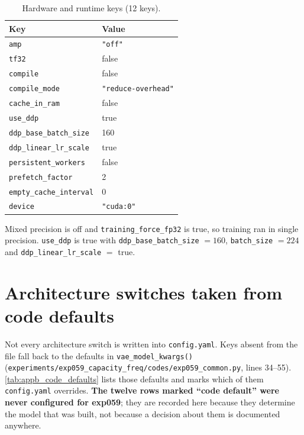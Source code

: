 \begin{table}[htbp]
\centering
\caption{Hardware and runtime keys (12 keys).}
\label{tab:appb_hardware}
\begin{tabular}{@{}ll@{}}
\hline
Key & Value \\
\hline
\texttt{amp} & \texttt{"off"} \\
\texttt{tf32} & false \\
\texttt{compile} & false \\
\texttt{compile\_mode} & \texttt{"reduce-overhead"} \\
\texttt{cache\_in\_ram} & false \\
\texttt{use\_ddp} & true \\
\texttt{ddp\_base\_batch\_size} & 160 \\
\texttt{ddp\_linear\_lr\_scale} & true \\
\texttt{persistent\_workers} & false \\
\texttt{prefetch\_factor} & 2 \\
\texttt{empty\_cache\_interval} & 0 \\
\texttt{device} & \texttt{"cuda:0"} \\
\hline
\end{tabular}
\end{table}

Mixed precision is off and \texttt{training\_force\_fp32} is true, so training ran in
single precision. \texttt{use\_ddp} is true with \texttt{ddp\_base\_batch\_size} $=160$,
\texttt{batch\_size} $=224$ and \texttt{ddp\_linear\_lr\_scale} $=$ true.

\clearpage

\section{Architecture switches taken from code defaults}
\label{sec:appb_code_defaults}

Not every architecture switch is written into \texttt{config.yaml}. Keys absent from the
file fall back to the defaults in \texttt{vae\_model\_kwargs()}
(\texttt{experiments/exp059\_capacity\_freq/codes/exp059\_common.py}, lines 34--55).
\autoref{tab:appb_code_defaults} lists those defaults and marks which of them
\texttt{config.yaml} overrides. \textbf{The twelve rows marked ``code default'' were never
configured for exp059}; they are recorded here because they determine the model that was
built, not because a decision about them is documented anywhere.

